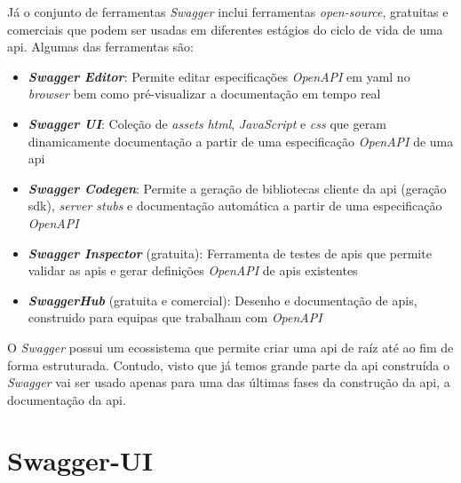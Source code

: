 Já o conjunto de ferramentas \textit{Swagger} inclui ferramentas \textit{open-source}, gratuitas e comerciais que podem ser usadas em diferentes estágios do ciclo de vida de uma \acrshort{api}. Algumas das ferramentas são:~\cite{swaggerVSoas}
\begin{itemize}
    \item \textbf{\textit{Swagger Editor}}: Permite editar especificações \textit{OpenAPI} em \acrshort{yaml} no \textit{browser} bem como pré-visualizar a documentação em tempo real
    \item \textbf{\textit{Swagger UI}}: Coleção de \textit{assets} \textit{\acrshort{html}}, \textit{JavaScript} e \textit{\acrshort{css}} que geram dinamicamente documentação a partir de uma especificação \textit{OpenAPI} de uma \acrshort{api}
    \item \textbf{\textit{Swagger Codegen}}: Permite a geração de bibliotecas cliente da \acrshort{api} (geração \acrshort{sdk}), \textit{server stubs} e documentação automática a partir de uma especificação \textit{OpenAPI}
    \item \textbf{\textit{Swagger Inspector}} (gratuita): Ferramenta de testes de \acrshort{api}s que permite validar as \acrshort{api}s e gerar definições \textit{OpenAPI} de \acrshort{api}s existentes
    \item \textbf{\textit{SwaggerHub}} (gratuita e comercial): Desenho e documentação de \acrshort{api}s, construido para equipas que trabalham com \textit{OpenAPI}
\end{itemize}

O \textit{Swagger} possui um ecossistema que permite criar uma \acrshort{api} de raíz até ao fim de forma estruturada. Contudo, visto que já temos grande parte da \acrshort{api} construída o \textit{Swagger} vai ser usado apenas para uma das últimas fases da construção da \acrshort{api}, a documentação da \acrshort{api}.


\section{Swagger-UI}



